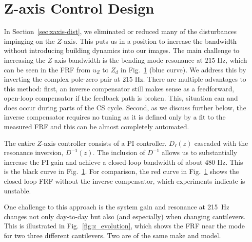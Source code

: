 \section{Z-axis Control Design}\label{sec:zaxis_cs_control}
In Section~\ref{sec:zaxis-dist}, we eliminated or reduced many of the disturbances impinging on the $Z$-axis. 
This puts us in a position to increase the bandwidth without introducing building dynamics into our images.
The main challenge to increasing the $Z$-axis bandwidth is the bending mode resonance at 215 Hz, which can be seen in the FRF from $u_Z$ to $Z_{d}$ in Fig.~\ref{fig:z_control} (blue curve). We address this by inverting the complex pole-zero pair at 215 Hz. There are multiple advantages to this method: first, an inverse compensator still makes sense as a feedforward, open-loop compensator if the feedback path is broken. This,  situation can and does occur during parts of the CS cycle. Second, as we discuss further below, the inverse compensator requires no tuning as it is defined only by a fit to the measured FRF and this can be almost completely automated. 

\begin{figure}[b!]
  \centering
  
  \caption{}
  \label{fig:z_control}
\end{figure}
The entire $Z$-axis controller consists of a PI controller, $D_I(z)$ cascaded with the resonance inversion, $D^{-1}(z)$. The inclusion of $D^{-1}$ allows us to substantially increase the PI gain and achieve a closed-loop bandwidth of about 480 Hz. This is the black curve in Fig.~\ref{fig:z_control}.
For comparison, the red curve in Fig.~\ref{fig:z_control} shows the closed-loop FRF without the inverse compensator, which experiments indicate is unstable.

One challenge to this approach is the system gain and resonance at 215~Hz changes not only day-to-day but also (and especially) when changing cantilevers. This is illustrated in Fig.~\ref{fig:z_evolution}, which shows the FRF near the mode for two three different cantilevers. Two are of the same make and model.

